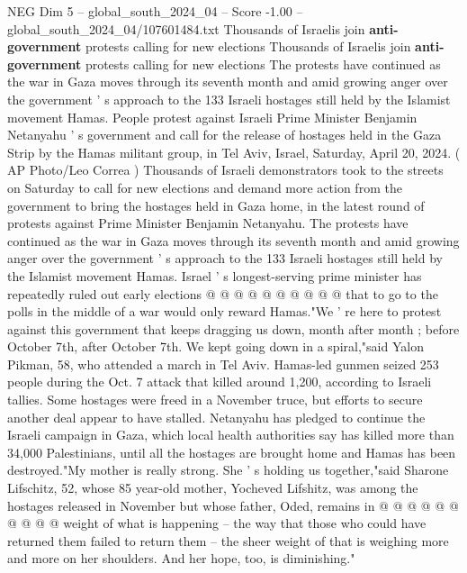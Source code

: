 \begin{textsample}{NEG Dim 5 – global\_south\_2024\_04 – Score -1.00 – global\_south\_2024\_04/107601484.txt}  \label{ex:f5_neg_112}
Thousands of Israelis join \textbf{anti-government} protests calling for new elections Thousands of Israelis join \textbf{anti-government} protests calling for new elections The protests have continued as the war in Gaza moves through its seventh month and amid growing anger over the government ' s approach to the 133 Israeli hostages still held by the Islamist movement Hamas.
People protest against Israeli Prime Minister Benjamin Netanyahu ' s government and call for the release of hostages held in the Gaza Strip by the Hamas militant group, in Tel Aviv, Israel, Saturday, April 20, 2024. ( AP Photo/Leo Correa ) Thousands of Israeli demonstrators took to the streets on Saturday to call for new elections and demand more action from the government to bring the hostages held in Gaza home, in the latest round of protests against Prime Minister Benjamin Netanyahu.
The protests have continued as the war in Gaza moves through its seventh month and amid growing anger over the government ' s approach to the 133 Israeli hostages still held by the Islamist movement Hamas.
Israel ' s longest-serving prime minister has repeatedly ruled out early elections @ @ @ @ @ @ @ @ @ @ that to go to the polls in the middle of a war would only reward Hamas."We ' re here to protest against this government that keeps dragging us down, month after month ; before October 7th, after October 7th.
We kept going down in a spiral,"said Yalon Pikman, 58, who attended a march in Tel Aviv.
Hamas-led gunmen seized 253 people during the Oct. 7 attack that killed around 1,200, according to Israeli tallies.
Some hostages were freed in a November truce, but efforts to secure another deal appear to have stalled.
Netanyahu has pledged to continue the Israeli campaign in Gaza, which local health authorities say has killed more than 34,000 Palestinians, until all the hostages are brought home and Hamas has been destroyed."My mother is really strong.
She ' s holding us together,"said Sharone Lifschitz, 52, whose 85 year-old mother, Yocheved Lifshitz, was among the hostages released in November but whose father, Oded, remains in @ @ @ @ @ @ @ @ @ @ weight of what is happening -- the way that those who could have returned them failed to return them -- the sheer weight of that is weighing more and more on her shoulders.
And her hope, too, is diminishing."

\end{textsample}
